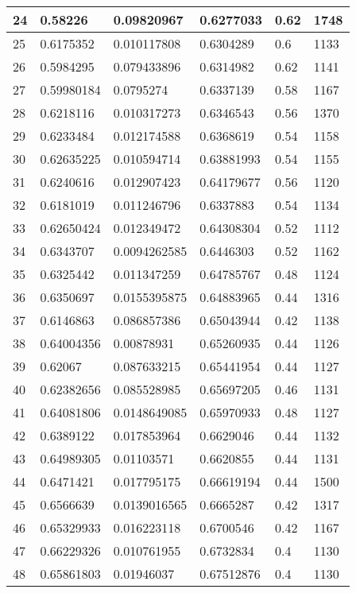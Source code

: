 \begin{longtable}{|l|l|l|l|l|l|}
24 & 0.58226 & 0.09820967 & 0.6277033 & 0.62 & 1748 \\ \hline 
25 & 0.6175352 & 0.010117808 & 0.6304289 & 0.6 & 1133 \\ \hline 
26 & 0.5984295 & 0.079433896 & 0.6314982 & 0.62 & 1141 \\ \hline 
27 & 0.59980184 & 0.0795274 & 0.6337139 & 0.58 & 1167 \\ \hline 
28 & 0.6218116 & 0.010317273 & 0.6346543 & 0.56 & 1370 \\ \hline 
29 & 0.6233484 & 0.012174588 & 0.6368619 & 0.54 & 1158 \\ \hline 
30 & 0.62635225 & 0.010594714 & 0.63881993 & 0.54 & 1155 \\ \hline 
31 & 0.6240616 & 0.012907423 & 0.64179677 & 0.56 & 1120 \\ \hline 
32 & 0.6181019 & 0.011246796 & 0.6337883 & 0.54 & 1134 \\ \hline 
33 & 0.62650424 & 0.012349472 & 0.64308304 & 0.52 & 1112 \\ \hline 
34 & 0.6343707 & 0.0094262585 & 0.6446303 & 0.52 & 1162 \\ \hline 
35 & 0.6325442 & 0.011347259 & 0.64785767 & 0.48 & 1124 \\ \hline 
36 & 0.6350697 & 0.0155395875 & 0.64883965 & 0.44 & 1316 \\ \hline 
37 & 0.6146863 & 0.086857386 & 0.65043944 & 0.42 & 1138 \\ \hline 
38 & 0.64004356 & 0.00878931 & 0.65260935 & 0.44 & 1126 \\ \hline 
39 & 0.62067 & 0.087633215 & 0.65441954 & 0.44 & 1127 \\ \hline 
40 & 0.62382656 & 0.085528985 & 0.65697205 & 0.46 & 1131 \\ \hline 
41 & 0.64081806 & 0.0148649085 & 0.65970933 & 0.48 & 1127 \\ \hline 
42 & 0.6389122 & 0.017853964 & 0.6629046 & 0.44 & 1132 \\ \hline 
43 & 0.64989305 & 0.01103571 & 0.6620855 & 0.44 & 1131 \\ \hline 
44 & 0.6471421 & 0.017795175 & 0.66619194 & 0.44 & 1500 \\ \hline 
45 & 0.6566639 & 0.0139016565 & 0.6665287 & 0.42 & 1317 \\ \hline 
46 & 0.65329933 & 0.016223118 & 0.6700546 & 0.42 & 1167 \\ \hline 
47 & 0.66229326 & 0.010761955 & 0.6732834 & 0.4 & 1130 \\ \hline 
48 & 0.65861803 & 0.01946037 & 0.67512876 & 0.4 & 1130 \\ \hline 

\end{longtable}
